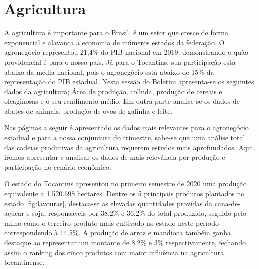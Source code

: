 \chapter{Agricultura}
\par A agricultura é importante para o Brasil, é um setor que cresce de forma exponencial e alavanca a economia de inúmeros estados da federação. O agronegócio representou 21,4\% do PIB nacional em 2019, demonstrando o quão providencial é para o nosso país. Já para o Tocantins, sua participação está abaixo da média nacional, pois o agronegócio está abaixo de 15\% da representação do PIB estadual. Nesta sessão do Boletim apresenta-se os seguintes dados da agricultura; Área de produção, colhida, produção de cereais e oleaginosas e o seu rendimento médio. Em outra parte analise-se os dados de abates de animais, produção de ovos de galinha e leite. 
\par Nas páginas a seguir é apresentado os dados mais relevantes para o agronegócio estadual e para a nossa conjuntura do trimestre, sabe-se que uma análise total das cadeias produtivas da agricultura requerem estudos mais aprofundados. Aqui, iremos apresentar e analisar os dados de mais relevância por produção e participação no cenário econômico.

\par O estado do Tocantins apresentou no primeiro semestre de 2020 uma produção  equivalente a 1.520.698 hectares. Dentre os 5 principais produtos plantados no estado \ref{fig:lavouras}, destaca-se as elevadas quantidades providas da cana-de-açúcar e soja, responsáveis por 38.2\% e 36.2\% do total produzido, seguido pelo milho como o terceiro produto mais cultivado no estado neste período correspondendo à 14.5\%. A produção de arroz e mandioca também ganha destaque ao representar um montante de 8.2\% e 3\% respectivamente, fechando assim o ranking dos cinco produtos com maior influência na agricultura tocantinense. 

